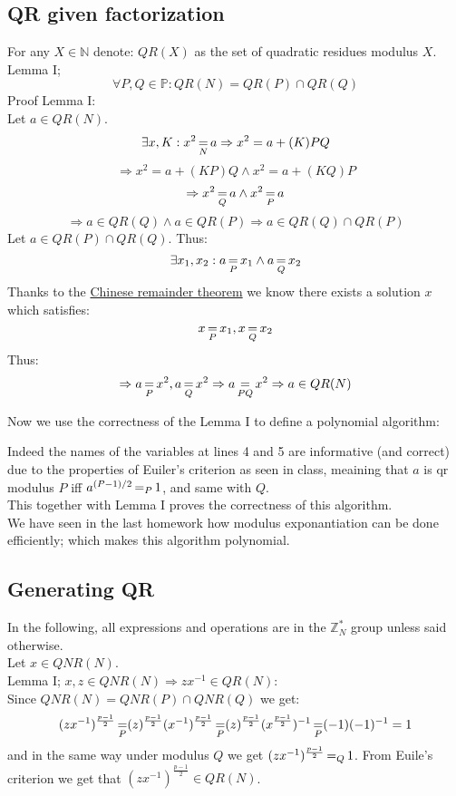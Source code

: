\subsection{QR given factorization}
For any $X\in\mathbb{N}$ denote: $QR(X)$ as the set of quadratic residues modulus $X$.\\
Lemma I;
\[
	\forall P,Q\in\mathbb{P}:QR(N)=QR(P)\cap QR(Q)
\]
Proof Lemma I:\\
Let $a\in QR(N)$.
\[
	\exists x,K: x^2\operatorname*{=}_N a
	\Rightarrow x^2=a+(K)PQ
\]\[
	\Rightarrow x^2=a+(KP)Q\wedge x^2=a+(KQ)P
\]\[
	\Rightarrow x^2\operatorname*{=}_Qa\wedge x^2\operatorname*{=}_Pa
\]\[
	\Rightarrow a\in QR(Q)\wedge a\in QR(P)
	\Rightarrow a\in QR(Q)\cap QR(P)
\]
Let $a\in QR(P)\cap QR(Q)$.
Thus:
\[
	\exists x_1,x_2: a\operatorname*{=}_Px_1\wedge a\operatorname*{=}_Qx_2	
\]
Thanks to the
\href{https://en.wikipedia.org/wiki/Chinese_remainder_theorem}
{Chinese remainder theorem}
we know there exists a solution $x$ which satisfies:
\[
	x\operatorname*{=}_Px_1,x\operatorname*{=}_Qx_2
\]
Thus:
\[
	\Rightarrow a\operatorname*{=}_Px^2,a\operatorname*{=}_Qx^2
	\Rightarrow a\operatorname*{=}_{PQ}x^2
	\Rightarrow a\in QR(N)
\]

Now we use the correctness of the Lemma I to define a polynomial algorithm:


Indeed the names of the variables at lines 4 and 5 are informative (and correct) due
to the properties of Euiler's criterion as seen in class, meaining that
$a$ is qr modulus $P$ iff $a^{(P-1)/2}\operatorname*{=}_P1$, and same with $Q$.\\
This together with Lemma I proves the correctness of this algorithm.\\

We have seen in the last homework how modulus exponantiation can be done efficiently;
which makes this algorithm polynomial.

\subsection{Generating QR}
In the following, all expressions and operations are in the $\mathbb{Z}_N^*$ group
unless said otherwise.\\

Let $x\in QNR(N)$.\\
Lemma I; $x,z\in QNR(N)\Rightarrow zx^{-1}\in QR(N)$:\\
Since $QNR(N)=QNR(P)\cap QNR(Q)$ we get:
\[
	(zx^{-1})^{\frac{p-1}{2}}
	\operatorname*{=}_P(z)^{\frac{p-1}{2}}(x^{-1})^{\frac{p-1}{2}}
	\operatorname*{=}_P(z)^{\frac{p-1}{2}}(x^{\frac{p-1}{2}})^{-1}
	\operatorname*{=}_P(-1)(-1)^{-1}=1
\]
and in the same way under modulus $Q$ we get $(zx^{-1})^{\frac{p-1}{2}}\operatorname*{=}_Q1$.
From Euile's criterion we get that $(zx^{-1})^{\frac{p-1}{2}}\in QR(N)$.\\

